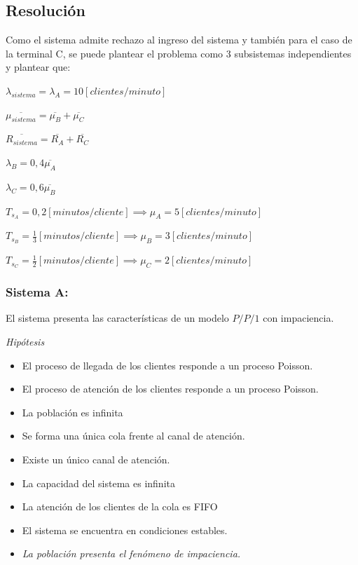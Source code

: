 \documentclass[a4paper,11pt]{article}
\begin{document}
\vspace{13pt}
\leftskip=0pt
\parindent=0pt
\subsection{\textbf{Resolución}}

Como el sistema admite rechazo al ingreso del sistema y también para el caso de
la terminal C, se puede plantear el problema como 3 subsistemas independientes
y plantear que:

\vspace{13pt}
\parindent=0pt

$\lambda_{sistema} = \lambda_A = 10 [clientes/minuto]$

$\overline{\mu_{sistema}} = \overline{\mu_B} + \overline{\mu_C}$

$\overline{R_{sistema}} = \overline{R_A} + \overline{R_C}$

$\lambda_B = 0,4\overline{\mu_A}$

$\lambda_C = 0,6\overline{\mu_B}$

$T_{s_A} = 0,2 [minutos/cliente] \implies \mu_A = 5 [clientes/minuto]$

$T_{s_B} = \frac{1}{3} [minutos/cliente] \implies \mu_B = 3 [clientes/minuto]$

$T_{s_C} = \frac{1}{2} [minutos/cliente] \implies \mu_C = 2 [clientes/minuto]$


\vspace{69pt}
\subsubsection{Sistema A:}

\parindent=26pt
El sistema presenta las características de un modelo $P/P/1$ con impaciencia.

\vspace{5pt}
\parindent=26pt
\textit{Hipótesis}

\leftskip=36pt
\begin{itemize}
  \item El proceso de llegada de los clientes responde a un proceso Poisson.
  \item El proceso de atención de los clientes responde a un proceso Poisson.
  \item La población es infinita
  \item Se forma una única cola frente al canal de atención.
  \item Existe un único canal de atención.
  \item La capacidad del sistema es infinita
  \item La atención de los clientes de la cola es FIFO
  \item El sistema se encuentra en condiciones estables.
  \item \textit{La población presenta el fenómeno de impaciencia.}
\end{itemize}
\end{document}
